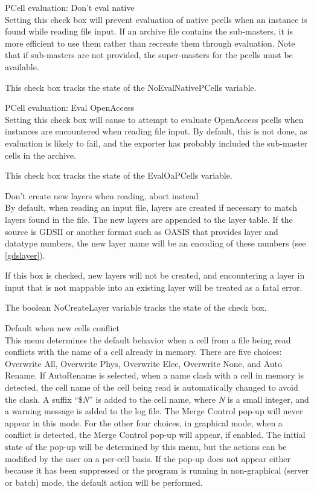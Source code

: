 \begin{description}
\item{\cb PCell evaluation:  Don't eval native}\\
Setting this check box will prevent evaluation of native pcells when
an instance is found while reading file input.  If an archive file
contains the sub-masters, it is more efficient to use them rather than
recreate them through evaluation.  Note that if sub-masters are not
provided, the super-masters for the pcells must be available.
 
This check box tracks the state of the {\et NoEvalNativePCells}
variable.
 
\item{\cb PCell evaluation:  Eval OpenAccess}\\
Setting this check box will cause {\Xic} to attempt to evaluate
OpenAccess pcells when instances are encountered when reading file
input.  By default, this is not done, as evaluation is likely to fail,
and the exporter has probably included the sub-master cells in the
archive.

This check box tracks the state of the {\et EvalOaPCells} variable. 

\item{\cb Don't create new layers when reading, abort instead}\\
By default, when reading an input file, layers are created if
necessary to match layers found in the file.  The new layers are
appended to the layer table.  If the source is GDSII or another format
such as OASIS that provides layer and datatype numbers, the new layer
name will be an encoding of these numbers (see \ref{gdslayer}).

If this box is checked, new layers will not be created, and
encountering a layer in input that is not mappable into an existing
{\Xic} layer will be treated as a fatal error.

The boolean {\et NoCreateLayer} variable tracks the state of the check
box.

\item{\cb Default when new cells conflict}\\
This menu determines the default behavior when a cell from a file
being read conflicts with the name of a cell already in memory.  There
are five choices:  {\cb Overwrite All}, {\cb Overwrite Phys}, {\cb
Overwrite Elec}, {\cb Overwrite None}, and {\cb Auto Rename}.  If {\cb
AutoRename} is selected, when a name clash with a cell in memory is
detected, the cell name of the cell being read is automatically
changed to avoid the clash.  A suffix ``{\vt \$}{\it N}'' is added to
the cell name, where {\it N} is a small integer, and a warning message
is added to the log file.  The {\cb Merge Control} pop-up will never
appear in this mode.  For the other four choices, in graphical mode,
when a conflict is detected, the {\cb Merge Control} pop-up will
appear, if enabled.  The initial state of the pop-up will be
determined by this menu, but the actions can be modified by the user
on a per-cell basis.  If the pop-up does not appear either because it
has been suppressed or the program is running in non-graphical (server
or batch) mode, the default action will be performed.


\end{description}
